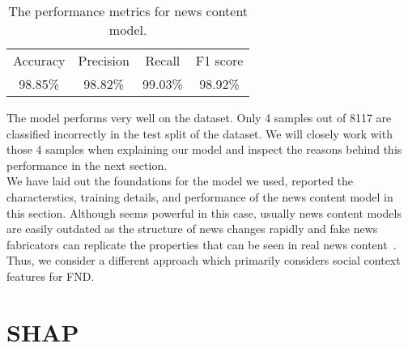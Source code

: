 \begin{table}
    \centering
    \begin{tabular}{c | c | c | c}
        Accuracy & Precision & Recall  & F1 score \\
        98.85\%  & 98.82\%   & 99.03\% & 98.92\%  \\
    \end{tabular}
    \caption[The performance metrics for news content model.]{The performance metrics for news content model.}
    \label{tab:newsContentModelPerformanceMetrics}
\end{table}
The model performs very well on the dataset. Only 4 samples out of 8117 are classified incorrectly in the test split of the dataset. We will closely work with those 4 samples when explaining our model and inspect the reasons behind this performance in the next section.\\
We have laid out the foundations for the model we used, reported the characterstics, training details, and performance of the news content model in this section. Although seems powerful in this case, usually news content models are easily outdated as the structure of news changes rapidly and fake news fabricators can replicate the properties that can be seen in real news content~\parencite{HierarchicalPropagationNetworksForFND_Shu}. Thus, we consider a different approach which primarily considers social context features for FND.\\

\section{SHAP}
\label{sec:SHAP}